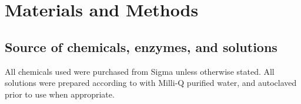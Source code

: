 \chapter{Materials and Methods}
\label{ch:methods}


  \section{Source of chemicals, enzymes, and solutions}
  All chemicals used were purchased from Sigma unless otherwise stated. All
  solutions were prepared according to  with Milli-Q
  purified water, and autoclaved prior to use when appropriate.

